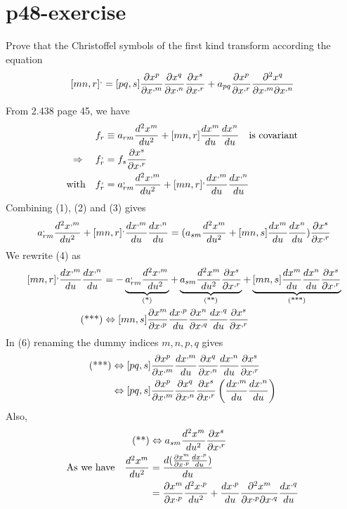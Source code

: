 \section{p48-exercise }
\begin{tcolorbox}
Prove that the Christoffel symbols of the first kind transform according the equation 
$$[mn,r]^, =  [pq,s]\pdv{x^p}{x^{,m}} \pdv{x^q}{x^{,n}}\pdv{x^s}{x^{,r}}+ a_{pq}\pdv{x^p}{x^{,r}}\pdv{x^q}{x^{,m}}{x^{,n}}$$
\end{tcolorbox}
From 2.438 page 45, we have
\begin{align}
\ f_r &\equiv a_{rm}\dv[2]{x^m}{u} +[mn,r]\dv{x^m}{u}\dv{x^n}{u} \quad\text{is covariant} \\
\Rightarrow\quad f_r^, &= f_s\pdv{x^s}{x^{,r}}\\
\text{with}\quad f_r^, &= a^,_{rm}\dv[2]{x^{,m}}{u} +[mn,r]^, \dv{x^{,m}}{u}\dv{x^{,n}}{u}
\end{align}
Combining (1), (2) and (3) gives 
\begin{align}
\ a^,_{rm}\dv[2]{x^{,m}}{u} +[mn,r]^, \dv{x^{,m}}{u}\dv{x^{,n}}{u} = ( a_{sm}\dv[2]{x^m}{u} +[mn,s]\dv{x^m}{u}\dv{x^n}{u})\pdv{x^s}{x^{,r}}
\end{align}
We rewrite (4) as 
\begin{align}
\ [mn,r]^, \dv{x^{,m}}{u}\dv{x^{,n}}{u} &= -\underbrace{a^,_{rm}\dv[2]{x^{,m}}{u}}_\text{(*)} +\underbrace{ a_{sm}\dv[2]{x^m}{u}\pdv{x^s}{x^{,r}}}_\text{(**)} +\underbrace{[mn,s]\dv{x^m}{u}\dv{x^n}{u}\pdv{x^s}{x^{,r}}}_\text{(***)}\\
\text{(***)} &\Leftrightarrow [mn,s]\pdv{x^m}{x^{,p}}\dv{x^{,p}}{u}\pdv{x^n}{x^{,q}}\dv{x^{,q}}{u}\pdv{x^s}{x^{,r}}
\end{align}
In (6) renaming the dummy indices $m,n,p,q$ gives
\begin{align}
\text{(***)} &\Leftrightarrow [pq,s]\pdv{x^p}{x^{,m}}\dv{x^{,m}}{u}\pdv{x^q}{x^{,n}}\dv{x^{,n}}{u}\pdv{x^s}{x^{,r}}\\
&\Leftrightarrow [pq,s]\pdv{x^p}{x^{,m}}\pdv{x^q}{x^{,n}}\pdv{x^s}{x^{,r}}\left(\dv{x^{,m}}{u}\dv{x^{,n}}{u}\right)
\end{align}
Also,
\begin{align}
\text{(**)} &\Leftrightarrow  a_{sm}\dv[2]{x^m}{u}\pdv{x^s}{x^{,r}}\\
\text{As we have}\quad \dv[2]{x^m}{u} &= \dv{(\pdv{x^m}{x^{,p}}\dv{x^{,p}}{u})}{u}\\
&= \pdv{x^m}{x^{,p}}\dv[2]{x^{,p}}{u}+\dv{x^{,p}}{u}\pdv{x^m}{x^{,p}}{x^{,q}}\dv{x^{,q}}{u} 
\end{align}
